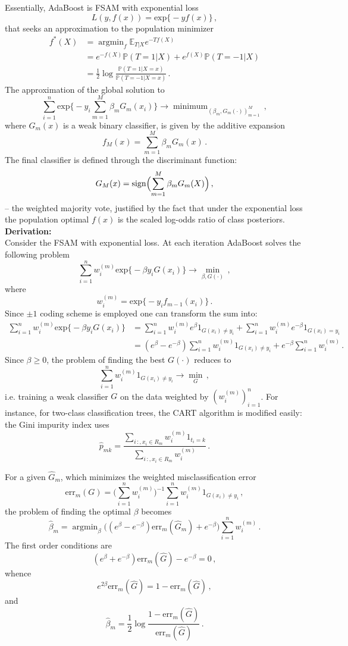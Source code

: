 \documentclass[a4paper]{article}
\newcommand{\ex}{\mathbb{E}}
\newcommand{\pr}{\mathbb{P}}
\newcommand{\argmin}{\mathop{\text{argmin}}}
\begin{document}
Essentially, AdaBoost is FSAM with exponential loss
\[ L(y,f(x)) = \text{exp}\bigl\{ -y f(x) \bigr\}\,, \]
that seeks an approximation to the population minimizer
\begin{align*}
	f^*(X) &= \argmin_f \ex_{T|X} e^{ - T f(X) } \\
	&= e^{-f(X)} \pr(T=1|X) + e^{f(X)} \pr(T=-1|X)\\
	&= \frac{1}{2} \log\frac{ \pr(T=1|X=x) }{ \pr(T=-1|X=x) } \,.
\end{align*}
The approximation of the global solution to
\[
\sum_{i=1}^n \text{exp}\bigl\{ - y_i \sum_{m=1}^M \beta_m G_m(x_i) \bigr\}
\to \mathop{\text{minimum}}_{ (\beta_m, G_m(\cdot))_{m=1}^M }\,,
\]
where $G_m(x)$ is a weak binary classifier, is given by the additive expansion
\[ f_M(x) = \sum_{m=1}^M \beta_m G_m(x) \,. \]
The final classifier is defined through the discriminant function:
\[
G_M(x)
= \text{sign} \Bigl( \sum_{m=1}^M \beta_m G_m(X) \Bigr) \,,
\]
-- the weighted majority vote, justified by the fact that under the exponential 
loss the population optimal $f(x)$ is the scaled log-odds ratio of class posteriors.\hfill\\

\noindent\textbf{Derivation:}\hfill\\
Consider the FSAM with exponential loss. At each iteration AdaBoost solves the
following problem 
\[
\sum_{i=1}^n w_i^{(m)} \text{exp}\bigl\{ -\beta y_i G(x_i) \bigr\}
\to \min_{\beta,G(\cdot)}\,,
\]
where 
\[ w_i^{(m)} = \text{exp}\bigl\{ -y_i f_{m-1}(x_i) \bigr\}\,. \]
Since $\pm1$ coding scheme is employed one can transform the sum into:
\begin{align*}
	\sum_{i=1}^n w_i^{(m)} \text{exp}\bigl\{ -\beta y_i G(x_i) \bigr\}
	&= \sum_{i=1}^n w_i^{(m)} e^\beta 1_{G(x_i) \neq y_i}
		+ \sum_{i=1}^n w_i^{(m)} e^{-\beta} 1_{G(x_i) = y_i} \\
	&= (e^\beta-e^{-\beta}) \sum_{i=1}^n w_i^{(m)} 1_{G(x_i) \neq y_i}
		+ e^{-\beta} \sum_{i=1}^n w_i^{(m)} \,.
\end{align*}
Since $\beta \geq 0$, the problem of finding the best $G(\cdot)$ reduces to
\[ \sum_{i=1}^n w_i^{(m)} 1_{G(x_i) \neq y_i} \to \min_G\,, \]
i.e. training a weak classifier $G$ on the data weighted by $(w_i^{(m)})_{i=1}^n$.
For instance, for two-class classification trees, the CART algorithm is modified
easily: the Gini impurity index uses
\[
\hat{p}_{mk}
 = \frac{ \sum_{i\,:,x_i\in R_m} w^{(m)}_i 1_{t_i=k} }
 	{ \sum_{i\,:,x_i\in R_m} w^{(m)}_i } \,.
\]

For a given $\hat{G}_m$, which minimizes the weighted misclassification error
\[
\text{err}_m(G)
= \bigl(\sum_{i=1}^n w_i^{(m)}\bigr)^{-1}
	\sum_{i=1}^n w_i^{(m)} 1_{G(x_i) \neq y_i} \,,
\]
the problem of finding the optimal $\beta$ becomes
\[
\hat{\beta}_m = \argmin_\beta
	\bigl( (e^\beta-e^{-\beta}) \text{err}_m(\hat{G}_m) + e^{-\beta} \bigr)
		\sum_{i=1}^n w_i^{(m)} \,.
\]
The first order conditions are
\[ (e^\beta+e^{-\beta}) \text{err}_m(\hat{G}) - e^{-\beta} = 0\,, \]
whence
\[ e^{2\beta} \text{err}_m(\hat{G}) = 1 - \text{err}_m(\hat{G}) \,, \]
and
\[
\hat{\beta}_m = \frac{1}{2} \log \frac{1-\text{err}_m(\hat{G})}{\text{err}_m(\hat{G})}\,.
\]
\end{document}
